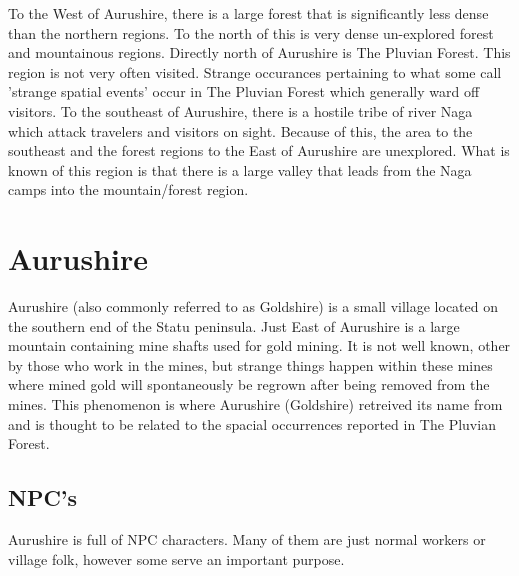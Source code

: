 \documentclass[letterpaper,10pt,twoside,twocolumn,openany]{book}
\begin{document}
To the West of Aurushire, there is a large forest that is significantly less dense than the northern regions. To the north of this is very dense un-explored forest and mountainous regions. Directly north of Aurushire is The Pluvian Forest. This region is not very often visited. Strange occurances pertaining to what some call 'strange spatial events' occur in The Pluvian Forest which generally ward off visitors. To the southeast of Aurushire, there is a hostile tribe of river Naga which attack travelers and visitors on sight. Because of this, the area to the southeast and the forest regions to the East of Aurushire are unexplored. What is known of this region is that there is a large valley that leads from the Naga camps into the mountain/forest region.

\section{Aurushire}

Aurushire (also commonly referred to as Goldshire) is a small village located on the southern end of the Statu peninsula. Just East of Aurushire is a large mountain containing mine shafts used for gold mining. It is not well known, other by those who work in the mines, but strange things happen within these mines where mined gold will spontaneously be regrown after being removed from the mines. This phenomenon is where Aurushire (Goldshire) retreived its name from and is thought to be related to the spacial occurrences reported in The Pluvian Forest. 

\subsection{NPC's}

Aurushire is full of NPC characters. Many of them are just normal workers or village folk, however some serve an important purpose.
\end{document}
